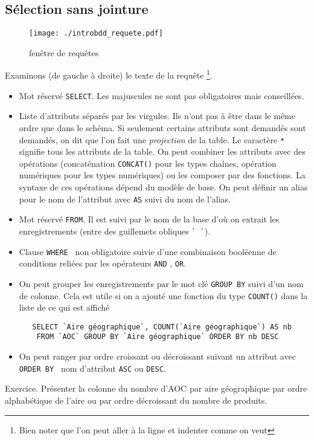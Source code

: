 \subsection{Sélection sans jointure}
\begin{figure}[h]
  \centering
  \texttt{[image: ./introbdd\_requete.pdf]}
  \caption{fenêtre de requêtes}
  \label{fig:requete}
\end{figure}
Examinons (de gauche à droite) le texte de la requête \footnote{Bien noter que l'on peut aller à la ligne et indenter comme on veut}.
\begin{itemize}
  \item Mot réservé \verb|SELECT|. Les majuscules ne sont pas obligatoires mais conseillées.
  \item Liste d'attributs séparés par les virgules. Ils n'ont pas à être dans le même ordre que dans le schéma. Si seulement certains attributs sont demandés sont demandés, on dit que l'on fait une \emph{projection} de la table. Le caractère \verb|*| signifie tous les attributs de la table. On peut combiner les attributs avec des opérations (concaténation \verb|CONCAT()| pour les types chaînes, opération numériques pour les types numériques) ou les composer par des fonctions. La syntaxe de ces opérations dépend du modèle de base. On peut définir un alias pour le nom de l'attribut avec \verb|AS| suivi du nom de l'alias.
  \item Mot réservé \verb|FROM|. Il est suivi par le nom de la base d'où on extrait les enregistrements (entre des guillemets obliques \verb|` `|).
  \item Clause \verb|WHERE | non obligatoire suivie d'une combinaison booléenne de conditions reliées par les opérateurs \verb|AND| , \verb|OR|.
  \item On peut grouper les enregistrements par le mot clé \verb|GROUP BY| suivi d'un nom de colonne. Cela est utile si on a ajouté une fonction du type \verb|COUNT()| dans la liste de ce qui est affiché
  \begin{verbatim}
   SELECT `Aire géographique`, COUNT(`Aire géographique`) AS nb 
    FROM `AOC` GROUP BY `Aire géographique` ORDER BY nb DESC
  \end{verbatim}
  \item On peut ranger par ordre croissant ou décroissant suivant un attribut avec \verb|ORDER BY | nom d'attribut \verb|ASC| ou \verb|DESC|.
\end{itemize}
Exercice. Présenter la colonne du nombre d'AOC par aire géographique par ordre alphabétique de l'aire ou par ordre décroissant du nombre de produits.

